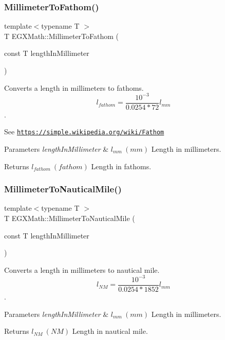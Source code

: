\subsubsection{\texorpdfstring{Millimeter\+To\+Fathom()}{MillimeterToFathom()}}
{\footnotesize\ttfamily template$<$typename T $>$ \\
T E\+G\+X\+Math\+::\+Millimeter\+To\+Fathom (\begin{DoxyParamCaption}\item[{const T}]{length\+In\+Millimeter }\end{DoxyParamCaption})}



Converts a length in millimeters to fathoms. \[ l_{fathom}= \frac{10^{-3}}{0.0254 * 72} l_{mm} \]. 

See \href{https://simple.wikipedia.org/wiki/Fathom}{\tt https\+://simple.\+wikipedia.\+org/wiki/\+Fathom} 
\begin{DoxyParams}{Parameters}
{\em length\+In\+Millimeter} & $ l_{mm}\ (mm)$ Length in millimeters. \\
\hline
\end{DoxyParams}
\begin{DoxyReturn}{Returns}
$ l_{fathom}\ (fathom)$ Length in fathoms. 
\end{DoxyReturn}
\mbox{\label{group___e_g_x_math-_conversions-_length_conversions-_s_i-_millimeter-_nautical_ga05ed5fb1300287763d8927ee90315808}} 
\subsubsection{\texorpdfstring{Millimeter\+To\+Nautical\+Mile()}{MillimeterToNauticalMile()}}
{\footnotesize\ttfamily template$<$typename T $>$ \\
T E\+G\+X\+Math\+::\+Millimeter\+To\+Nautical\+Mile (\begin{DoxyParamCaption}\item[{const T}]{length\+In\+Millimeter }\end{DoxyParamCaption})}



Converts a length in millimeters to nautical mile. \[ l_{NM}= \frac{10^{-3}}{0.0254 * 1852} l_{mm} \]. 


\begin{DoxyParams}{Parameters}
{\em length\+In\+Millimeter} & $ l_{mm}\ (mm)$ Length in millimeters. \\
\hline
\end{DoxyParams}
\begin{DoxyReturn}{Returns}
$ l_{NM}\ (NM)$ Length in nautical mile. 
\end{DoxyReturn}
